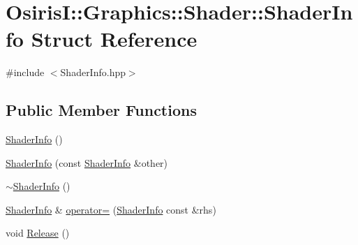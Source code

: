 \hypertarget{struct_osiris_i_1_1_graphics_1_1_shader_1_1_shader_info}{\section{Osiris\-I\-:\-:Graphics\-:\-:Shader\-:\-:Shader\-Info Struct Reference}
\label{struct_osiris_i_1_1_graphics_1_1_shader_1_1_shader_info}
}


{\ttfamily \#include $<$Shader\-Info.\-hpp$>$}

\subsection*{Public Member Functions}
\begin{DoxyCompactItemize}
\item 
\hyperlink{struct_osiris_i_1_1_graphics_1_1_shader_1_1_shader_info_aa091a922f1092037eceecde8c961d879}{Shader\-Info} ()
\item 
\hyperlink{struct_osiris_i_1_1_graphics_1_1_shader_1_1_shader_info_acf0b8337c9af0da69169afd66b9d6243}{Shader\-Info} (const \hyperlink{struct_osiris_i_1_1_graphics_1_1_shader_1_1_shader_info}{Shader\-Info} \&other)
\item 
\hyperlink{struct_osiris_i_1_1_graphics_1_1_shader_1_1_shader_info_a79bdc5b3923b474e113eb2687e3a24bf}{$\sim$\-Shader\-Info} ()
\item 
\hyperlink{struct_osiris_i_1_1_graphics_1_1_shader_1_1_shader_info}{Shader\-Info} \& \hyperlink{struct_osiris_i_1_1_graphics_1_1_shader_1_1_shader_info_a9482bf453b888cc933f7494e5e69932a}{operator=} (\hyperlink{struct_osiris_i_1_1_graphics_1_1_shader_1_1_shader_info}{Shader\-Info} const \&rhs)
\item 
void \hyperlink{struct_osiris_i_1_1_graphics_1_1_shader_1_1_shader_info_a56ac56602b9b998e5b8e39a057b06748}{Release} ()
\end{DoxyCompactItemize}
